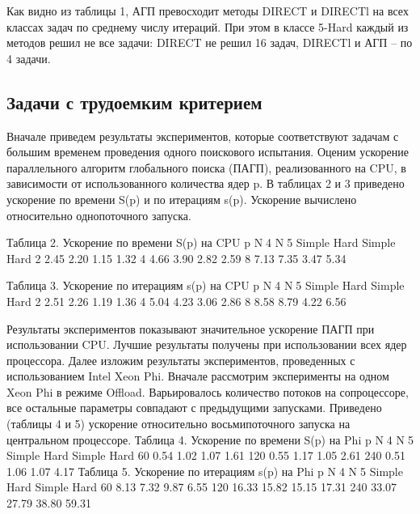 Как видно из таблицы 1, АГП превосходит методы DIRECT и DIRECTl на всех классах задач по среднему числу итераций. При этом в классе 5-Hard каждый из методов решил не все задачи: DIRECT не решил 16 задач, DIRECTl и АГП – по 4 задачи.
\subsection{Задачи с трудоемким критерием}
Вначале приведем результаты экспериментов, которые соответствуют задачам с большим временем проведения одного поискового испытания. Оценим ускорение параллельного алгоритм глобального поиска (ПАГП), реализованного на CPU, в зависимости от использованного количества ядер p. В таблицах 2 и 3 приведено ускорение по времени S(p) и по итерациям s(p). Ускорение вычислено относительно однопоточного запуска.

Таблица 2. Ускорение по времени S(p) на CPU
p	N4	N5
	Simple	Hard	Simple	Hard
2	2.45	2.20	1.15	1.32
4	4.66	3.90	2.82	2.59
8	7.13	7.35	3.47	5.34


Таблица 3. Ускорение по итерациям s(p) на CPU
p	N4	N5
	Simple	Hard	Simple	Hard
2	2.51	2.26	1.19	1.36
4	5.04	4.23	3.06	2.86
8	8.58	8.79	4.22	6.56

Результаты экспериментов показывают значительное ускорение ПАГП при использовании CPU. Лучшие результаты получены при использовании всех ядер процессора.
Далее изложим результаты экспериментов, проведенных с использованием Intel Xeon Phi. Вначале рассмотрим эксперименты на одном Xeon Phi в режиме Offload. Варьировалось количество потоков на сопроцессоре, все остальные параметры совпадают с предыдущими запусками. Приведено (таблицы 4 и 5) ускорение относительно восьмипоточного запуска на центральном процессоре.
Таблица 4. Ускорение по времени S(p) на Phi
p	N4	N5
	Simple	Hard	Simple	Hard
60	0.54	1.02	1.07	1.61
120	0.55	1.17	1.05	2.61
240	0.51	1.06	1.07	4.17
Таблица 5. Ускорение по итерациям s(p) на Phi
p	N4	N5
	Simple	Hard	Simple	Hard
60	8.13	7.32	9.87	6.55
120	16.33	15.82	15.15	17.31
240	33.07	27.79	38.80	59.31

